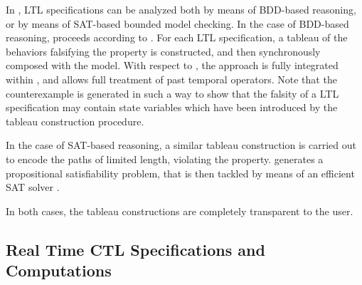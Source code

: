 In \nusmv, LTL specifications can be analyzed both by means of
BDD-based reasoning, or by means of SAT-based bounded model
checking. 
%
In the case of BDD-based reasoning, \nusmv proceeds according to
\cite{CGH97}. 
%
For each LTL specification, a tableau of the behaviors falsifying the
property is constructed, and then synchronously composed with the
model. 
%
With respect to \cite{CGH97}, the approach is fully integrated within
\nusmv, and allows full treatment of past temporal operators. 
%
Note that the counterexample is generated in such a way to show that the falsity
of a LTL specification may contain state variables which have been
introduced by the tableau construction procedure.

In the case of SAT-based reasoning, a similar tableau construction is
carried out to encode the paths of limited length, violating the
property.
%
\nusmv generates a propositional satisfiability problem, that is then
tackled by means of an efficient SAT solver \cite{BCCZ99}.

In both cases, the tableau constructions are completely transparent to
the user.

\subsection{Real Time CTL Specifications and Computations}
\label{Real Time CTL Specifications and Computations}

